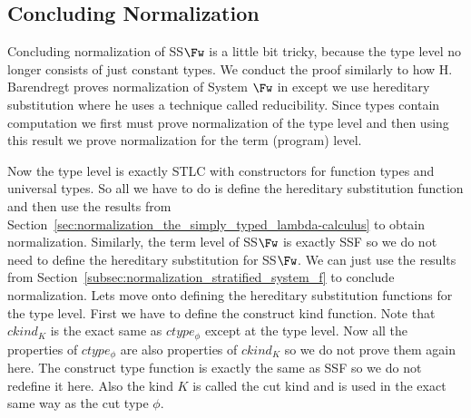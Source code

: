 \subsection{Concluding Normalization}
\label{subsec:concluding_normalization_ssfw}
Concluding normalization of SS$\Fw$ is a little bit tricky, because
the type level no longer consists of just constant types.  We conduct
the proof similarly to how H. Barendregt proves normalization of
System $\Fw$ in \cite{barendregt92} except we use hereditary
substitution where he uses a technique called reducibility.  Since
types contain computation we first must prove normalization of the
type level and then using this result we prove normalization for the
term (program) level.  

Now the type level is exactly STLC with constructors for function
types and universal types.  So all we have to do is define the
hereditary substitution function and then use the results from
Section~\ref{sec:normalization_the_simply_typed_lambda-calculus} to
obtain normalization.  Similarly, the term level of SS$\Fw$ is exactly
SSF so we do not need to define the hereditary substitution for
SS$\Fw$.  We can just use the results from
Section~\ref{subsec:normalization_stratified_system_f} to conclude
normalization.  Lets move onto defining the hereditary substitution
functions for the type level.  First we have to define the construct
kind function.  Note that $ckind_K$ is
the exact same as $ctype_\phi$ except at the type level.  Now all the
properties of $ctype_\phi$ are also properties of $ckind_K$ so we do
not prove them again here.  The construct type function is exactly the
same as SSF so we do not redefine it here.  Also the kind $K$ is
called the cut kind and is used in the exact same way as the cut type
$\phi$.

